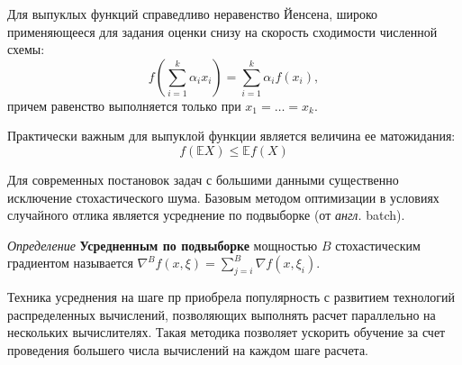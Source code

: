 Для выпуклых функций справедливо неравенство Йенсена, широко применяющееся для задания оценки снизу на скорость 
сходимости численной схемы:
\begin{equation}
    f \left( \sum_{i=1}^k \alpha_i x_i \right) = \sum_{i=1}^k \alpha_i f(x_i),
\end{equation}
причем равенство выполняется только при $x_1 = \dots =x_k$.

Практически важным для выпуклой функции является величина ее матожидания:
\begin{equation}
    f(\mathbb{E} X) \le \mathbb{E} f(X)
\end{equation}

Для современных постановок задач с большими данными существенно исключение стохастического шума. Базовым методом
оптимизации в условиях случайного отлика является усреднение по подвыборке (от \textit{англ.} batch). 

\textit{Определение} \textbf{Усредненным по подвыборке} мощностью $B$ стохастическим градиентом называется 
$\nabla^B f(x,\xi) = \sum_{j=i}^B \nabla f(x,\xi_i)$.

Техника усреднения на шаге пр приобрела популярность с развитием технологий распределенных вычислений, позволяющих выполнять
расчет параллельно на нескольких вычислителях. Такая методика позволяет ускорить обучение за счет 
проведения большего числа вычислений на каждом шаге расчета.



